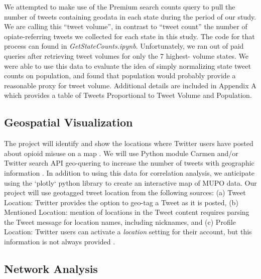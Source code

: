 \documentclass[sigconf]{acmart}
\begin{document}
We attempted to make use of the Premium search counts query to pull the number 
of tweets containing geodata in each state during the period of our study. 
We are calling this ``tweet volume'', in contrast to ``tweet count'' the number 
of opiate-referring tweets we collected for each state in this study. The code 
for that process can found in \emph{GetStateCounts.ipynb}. Unfortunately, we 
ran out of paid queries after retrieving tweet volumes for only the 7 highest-
volume states. We were able to use this data to evaluate the idea of simply 
normalizing state tweet counts on population, and found that population would 
probably provide a reasonable proxy for tweet volume. Additional details are 
included in Appendix A which provides a table of Tweets Proportional to Tweet 
Volume and Population.



\subsection{Geospatial Visualization}

The project will identify and show the locations where Twitter users have 
posted about opioid misuse on a map \cite{twittergeo}. We will use Python 
module Carmen and/or Twitter search API geo-quering to increase the number of 
tweets with geographic information \cite{dredze13}. In addition to using this 
data for correlation analysis, we anticipate using the `plotly` python library 
to create an interactive map of MUPO data. Our project will use geotagged tweet 
location from the following sources: (a) Tweet Location: Twitter provides the 
option to geo-tag a Tweet as it is posted, (b) Mentioned Location: mention of 
locations in the Tweet content requires parsing the Tweet message for location 
names, including nicknames, and (c) Profile Location: Twitter users can 
activate a \emph{location} setting for their account, but this information 
is not always provided \cite{widener14}. 

\subsection{Network Analysis} 
\end{document}
